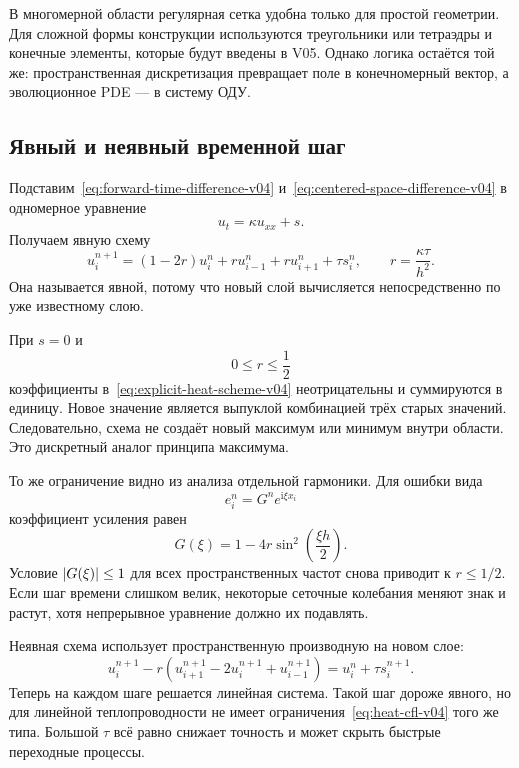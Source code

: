В многомерной области регулярная сетка удобна только для простой геометрии. Для сложной формы конструкции используются треугольники или тетраэдры и конечные элементы, которые будут введены в V05. Однако логика остаётся той же: пространственная дискретизация превращает поле в конечномерный вектор, а эволюционное PDE --- в систему ОДУ.

\subsection{Явный и неявный временной шаг}

Подставим~\eqref{eq:forward-time-difference-v04} и~\eqref{eq:centered-space-difference-v04} в одномерное уравнение
\[
 u_t=\kappa u_{xx}+s.
\]
Получаем явную схему
\begin{equation}
\label{eq:explicit-heat-scheme-v04}
 u_i^{n+1}
 =
 (1-2r)u_i^n
 +r u_{i-1}^n
 +r u_{i+1}^n
 +\tau s_i^n,
 \qquad
 r=\frac{\kappa\tau}{h^2}.
\end{equation}
Она называется явной, потому что новый слой вычисляется непосредственно по уже известному слою.

При $s=0$ и
\begin{equation}
\label{eq:heat-cfl-v04}
 0\leq r\leq\frac12
\end{equation}
коэффициенты в~\eqref{eq:explicit-heat-scheme-v04} неотрицательны и суммируются в единицу. Новое значение является выпуклой комбинацией трёх старых значений. Следовательно, схема не создаёт новый максимум или минимум внутри области. Это дискретный аналог принципа максимума.

То же ограничение видно из анализа отдельной гармоники. Для ошибки вида
\[
 e_i^n=G^n e^{\mathrm{i}\xi x_i}
\]
коэффициент усиления равен
\begin{equation}
\label{eq:heat-amplification-factor-v04}
 G(\xi)
 =
 1-4r\sin^2\!\left(\frac{\xi h}{2}\right).
\end{equation}
Условие $\lvert G(\xi)\rvert\leq1$ для всех пространственных частот снова приводит к $r\leq1/2$. Если шаг времени слишком велик, некоторые сеточные колебания меняют знак и растут, хотя непрерывное уравнение должно их подавлять.

Неявная схема использует пространственную производную на новом слое:
\begin{equation}
\label{eq:implicit-heat-scheme-v04}
 u_i^{n+1}
 -r\left(
 u_{i+1}^{n+1}-2u_i^{n+1}+u_{i-1}^{n+1}
 \right)
 =
 u_i^n+\tau s_i^{n+1}.
\end{equation}
Теперь на каждом шаге решается линейная система. Такой шаг дороже явного, но для линейной теплопроводности не имеет ограничения~\eqref{eq:heat-cfl-v04} того же типа. Большой $\tau$ всё равно снижает точность и может скрыть быстрые переходные процессы.

